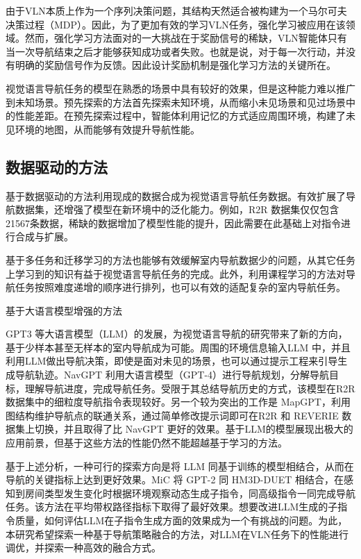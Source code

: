 \documentclass[bachelor]{thesis-uestc}
\begin{document}
   由于VLN本质上作为一个序列决策问题，其结构天然适合被构建为一个马尔可夫决策过程（MDP）。因此，为了更加有效的学习VLN任务，强化学习被应用在该领域。然而，强化学习方法面对的一大挑战在于奖励信号的稀缺，VLN智能体只有当一次导航结束之后才能够获知成功或者失败。也就是说，对于每一次行动，并没有明确的奖励信号作为反馈。因此设计奖励机制是强化学习方法的关键所在。

   视觉语言导航任务的模型在熟悉的场景中具有较好的效果，但是这种能力难以推广到未知场景。预先探索的方法首先探索未知环境，从而缩小未见场景和见过场景中的性能差距。在预先探索过程中，智能体利用记忆的方式适应周围环境，构建了未见环境的地图，从而能够有效提升导航性能。

\subsection{数据驱动的方法}
   基于数据驱动的方法利用现成的数据合成为视觉语言导航任务数据。有效扩展了导航数据集，还增强了模型在新环境中的泛化能力。例如，R2R 数据集仅仅包含21567条数据，稀缺的数据增加了模型性能的提升，因此需要在此基础上对指令进行合成与扩展。

   基于多任务和迁移学习的方法也能够有效缓解室内导航数据少的问题，从其它任务上学习到的知识有益于视觉语言导航任务的完成。此外，利用课程学习的方法对导航任务按照难度递增的顺序进行排列，也可以有效的适配复杂的室内导航任务。

基于大语言模型增强的方法

GPT3\cite{ouyangTrainingLanguageModels2022} 等大语言模型（LLM）的发展，为视觉语言导航的研究带来了新的方向，基于少样本甚至无样本的室内导航成为可能。周围的环境信息输入LLM 中，并且利用LLM做出导航决策，即使是面对未见的场景，也可以通过提示工程来引导生成导航轨迹。NavGPT\cite{zhouNavGPTExplicitReasoning2023a} 利用大语言模型（GPT-4\cite{openaiGPT4TechnicalReport2024}）进行导航规划，分解导航目标，理解导航进度，完成导航任务。受限于其总结导航历史的方式，该模型在R2R数据集中的细粒度导航指令表现较好。另一个较为突出的工作是 MapGPT\cite{chenMapGPTMapGuidedPrompting2024}，利用图结构维护导航点的联通关系，通过简单修改提示词即可在R2R 和 REVERIE 数据集上切换，并且取得了比 NavGPT 更好的效果。基于LLM的模型展现出极大的应用前景，但基于这些方法的性能仍然不能超越基于学习的方法。

  
基于上述分析，一种可行的探索方向是将 LLM 同基于训练的模型相结合，从而在导航的关键指标上达到更好效果。MiC\cite{qiaoMarchChatInteractive2023} 将 GPT-2\cite{brownLanguageModelsAre2020} 同 HM3D-DUET \cite{chenLearningUnlabeled3D2022} 相结合，在感知到房间类型发生变化时根据环境观察动态生成子指令，同高级指令一同完成导航任务。该方法在平均带权路径指标下取得了最好效果。想要改进LLM生成的子指令质量，如何评估LLM在子指令生成方面的效果成为一个有挑战的问题。为此，本研究希望探索一种基于导航策略融合的方法，对LLM在VLN任务下的性能进行调优，并探索一种高效的融合方式。
\end{document}

